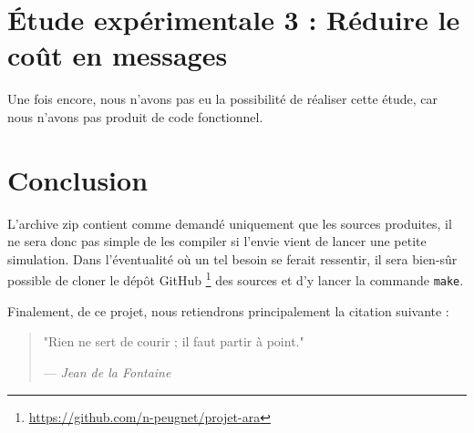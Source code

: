\documentclass[french]{article}
\begin{document}
\section{Étude expérimentale 3 : Réduire le coût en messages}

Une fois encore, nous n'avons pas eu la possibilité de réaliser cette étude, car nous n'avons pas produit de code fonctionnel.

\section*{Conclusion}

L'archive zip contient comme demandé uniquement que les sources produites, il ne sera donc pas simple de les compiler si l'envie vient de lancer une petite simulation.
Dans l'éventualité où un tel besoin se ferait ressentir, il sera bien-sûr possible de cloner le dépôt GitHub
\footnote{\url{https://github.com/n-peugnet/projet-ara}}
des sources et d'y lancer la commande \lstinline{make}.

Finalement, de ce projet, nous retiendrons principalement la citation suivante :

\begin{quotation}
	"Rien ne sert de courir ; il faut partir à point."

	--- \emph{Jean de la Fontaine}
\end{quotation}
\end{document}
